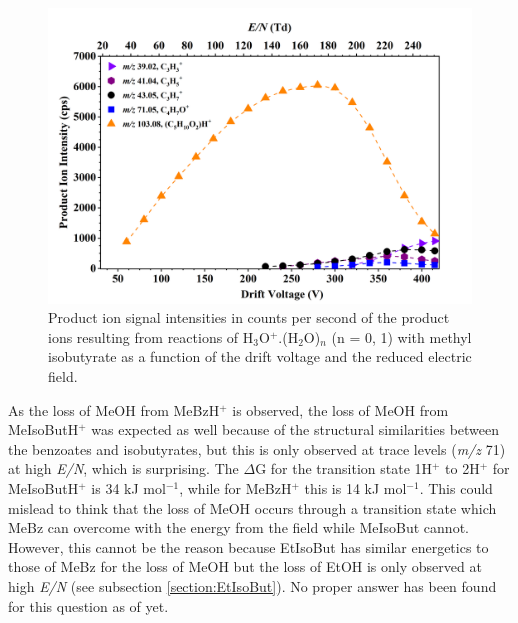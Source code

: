 \begin{figure}[htbp]
\centering
\includegraphics[width=0.8\linewidth]{pics/cocaine-chapter/MeIsobyturate-cps.png}
\caption{Product ion signal intensities in counts per second of the product ions resulting from reactions of H$_3$O$^+$.(H$_2$O)$_n$ (n = 0, 1) with methyl isobutyrate as a function of the drift voltage and the reduced electric field.} 
\label{fig:MeIsoEN}
\end{figure}




As the loss of MeOH from MeBzH$^+$ is observed, the loss of MeOH from MeIsoButH$^+$ was expected as well because of the structural similarities between the benzoates and isobutyrates, 
but this is only observed at trace levels (\textit{m/z} 71) at high \textit{E/N}, which is surprising.
%
The $\Delta$G for the transition state 1H$^+$ to 2H$^+$ for MeIsoButH$^+$ is 34 kJ mol$^{-1}$, while for MeBzH$^+$ this is 14 kJ mol$^{-1}$.
%
This could  mislead to think that the loss of MeOH occurs through a transition state which MeBz can overcome with the energy from the field while MeIsoBut cannot.
%
However, this cannot be the reason because EtIsoBut has similar energetics to those of MeBz for the loss of MeOH but the loss of EtOH is only observed at high \textit{E/N} (see subsection \ref{section:EtIsoBut}).
%
No proper answer has been found for this question as of yet.


%
%
%

